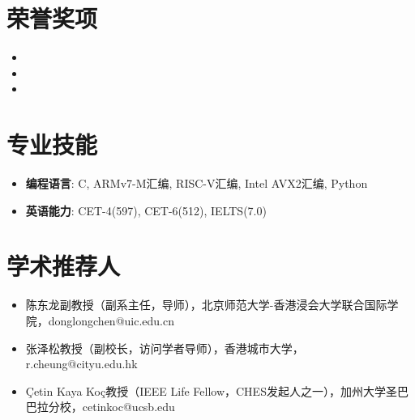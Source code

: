\documentclass[UTF8,AutoFakeBold]{resume}
\begin{document}
\section{\hspace{0.25em}\makebox[0.75em][c]{\faTrophy} \fangsong\textbf{荣誉奖项}}
    \vspace{0.1em}
    \begin{itemize}
        \item {}
        \item {}
        \item {}
    \end{itemize}
\vspace{2mm}
\section{\hspace{0.25em}\makebox[0.75em][c]{\faPuzzlePiece} \fangsong\textbf{专业技能}}
\noindent

\begin{itemize}
    \item \kaishu\textbf{编程语言}: C, ARMv7-M汇编, RISC-V汇编, Intel AVX2汇编, Python
    \item \kaishu\textbf{英语能力}: CET-4(597), CET-6(512), IELTS(7.0)
\end{itemize}

\vspace{2mm}
\section{\hspace{0.25em}\makebox[0.75em][c]{\faUsers} \fangsong\textbf{学术推荐人}}
\vspace{0.1em}
    \begin{itemize}
        \item \kaishu 陈东龙副教授（副系主任，导师），北京师范大学-香港浸会大学联合国际学院，donglongchen@uic.edu.cn
        \item \kaishu 张泽松教授（副校长，访问学者导师），香港城市大学，r.cheung@cityu.edu.hk
        \item \kaishu Çetin Kaya Koç教授（IEEE Life Fellow，CHES发起人之一），加州大学圣巴巴拉分校，cetinkoc@ucsb.edu
    \end{itemize}
\end{document}
